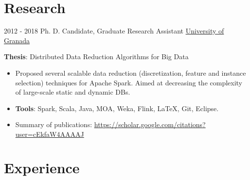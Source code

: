 \documentclass[letterpaper]{twentysecondcv} %
\begin{document}
\section{Research}
\begin{twenty}
	\twentyitem
    	{2012 - 2018}
		{}
        {Ph. D. Candidate, Graduate Research Assistant}
        {\href{http://www.ugr.es/}{University of Granada}}
        {}
        {
       	\textbf{Thesis}: Distributed Data Reduction Algorithms for Big Data
        {\begin{itemize}
        \item Proposed several scalable data reduction (discretization, feature and instance selection) techniques for Apache Spark. Aimed at decreasing the complexity of large-scale static and dynamic DBs.
        \item \textbf{Tools}: Spark, Scala, Java, MOA, Weka, Flink, \LaTeX, Git, Eclipse.
        \item Summary of publications: \url{https://scholar.google.com/citations?user=cEkfaW4AAAAJ}
		\end{itemize}}
        }
\end{twenty}


\section{Experience}
\end{document}
